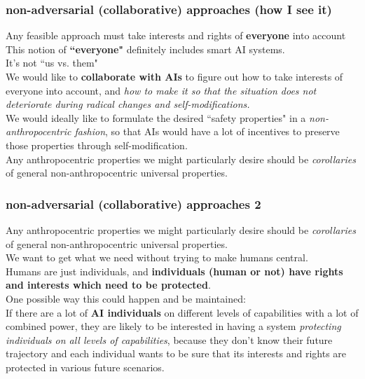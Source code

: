 \documentclass{beamer}
\begin{document}
\begin{frame}

  \frametitle{non-adversarial (collaborative) approaches (how I see it)}

Any feasible approach must take interests and rights of {\bf everyone} into account\\[2ex]

This notion of {\bf ``everyone"} definitely includes smart AI systems.\\[2ex]

It's not ``us vs. them"\\[2ex]

We would like to {\bf collaborate with AIs} to figure out how to take interests of everyone
into account, and {\em how to make it so that the situation does not deteriorate
during radical changes and self-modifications.}\\[2ex]

We would ideally like to formulate the desired ``safety properties" in a {\em non-anthropocentric fashion},
so that AIs would have a lot of incentives to preserve those properties through self-modification.\\[2ex]

Any anthropocentric properties we might particularly desire should be
{\em corollaries} of general non-anthropocentric universal properties.

\end{frame}

\begin{frame}

  \frametitle{non-adversarial (collaborative) approaches 2}

Any anthropocentric properties we might particularly desire should be
{\em corollaries} of general non-anthropocentric universal properties.\\[2ex]

We want to get what we need without trying to make humans central.\\[2ex]

Humans are just individuals, and {\bf individuals (human or not) have rights and interests 
which need to be protected}.\\[2ex]

One possible way this could happen and be maintained:\\[2ex]

If there are a lot of {\bf AI individuals} on different levels of capabilities with a lot of combined power,
they are likely to be interested in having a system {\em protecting individuals on all levels of
capabilities}, because they don't know their future trajectory and each individual wants to be sure that
its interests and rights are protected in various future scenarios.

\end{frame}
\end{document}
